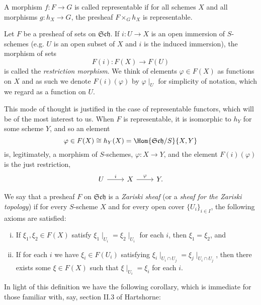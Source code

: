 \documentclass[10pt]{amsart}
\begin{document}
\begin{defn}
  A morphism $f \colon F \rightarrow G$ is called representable if for all schemes $X$ and all morphisms $g : h_X \rightarrow G$, the presheaf $F \times_G h_X$ is representable.
\end{defn}

Let $F$ be a presheaf of sets on $\mathfrak{Sch}$.
If $i : U \rightarrow X$ is an open immersion of $S$-schemes (e.g. $U$ is an open subset of $X$ and $i$ is the induced immersion), the morphism of sets
$$F(i) : F(X) \rightarrow F(U)$$
is called the {\em restriction morphism}.
We think of elements $\varphi \in F(X)$ as functions on $X$ and as such we denote $F(i)(\varphi)$ by  $\varphi\mid_U$ for simplicity of notation, which we regard as a function on $U$.

\begin{rmk}
  This mode of thought is justified in the case of representable functors, which will be of the most interest to us.  When $F$ is representable, it is isomorphic to $h_Y$ for some scheme $Y$, and so an element
  $$\varphi \in F(X) \cong h_Y(X) = \Hom{\mathfrak{Sch}/S}{X,Y}$$
  is, legitimately, a morphism of $S$-schemes, $\varphi : X \rightarrow Y$, and the element $F(i)(\varphi)$ is the just restriction,
  $$\begin{tikzcd}
    U \arrow{r}{i} & X\arrow{r}{\varphi} & Y.
  \end{tikzcd}$$
\end{rmk}

\begin{defn}
  We say that a presheaf $F$ on $\mathfrak{Sch}$ is a {\em Zariski sheaf} (or a {\em sheaf for the Zariski topology}) if for every $S$-scheme $X$ and for every open cover $\{U_i\}_{i \in I}$, the following axioms are satisfied:
  \begin{enumerate}[(i)]
  \item
    If $\xi_1, \xi_2 \in F(X)$ satisfy $\xi_1\mid_{U_i} = \xi_2\mid_{U_i}$ for each $i$, then $\xi_1 = \xi_2$, and
  \item
    If for each $i$ we have $\xi_i \in F(U_i)$ satisfying $\xi_i\mid_{U_i \cap U_j} = \xi_j\mid_{U_i \cap U_j}$, then there exists some $\xi \in F(X)$ such that $\xi\mid_{U_i} = \xi_i$ for each $i$.
  \end{enumerate}
\end{defn}

In light of this definition we have the following corollary, which is immediate for those familiar with, say, section II.3 of Hartshorne:
\end{document}
